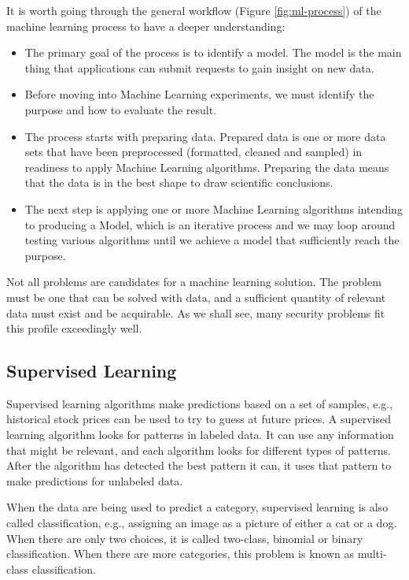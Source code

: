 It is worth going through the general workflow (Figure \ref{fig:ml-process}) of the machine learning process to have a deeper understanding:

\begin{itemize}
\item The primary goal of the process is to identify a model. The model is the main thing that applications can submit requests to gain insight on new data.
\item Before moving into Machine Learning experiments, we must identify the purpose and how to evaluate the result.
\item The process starts with preparing data. Prepared data is one or more data sets that have been preprocessed (formatted, cleaned and sampled) in readiness to apply Machine Learning algorithms. Preparing the data means that the data is in the best shape to draw scientific conclusions.
\item The next step is applying one or more Machine Learning algorithms intending to producing a Model, which is an iterative process and we may loop around testing various algorithms until we achieve a model that sufficiently reach the purpose.
\end{itemize}

Not all problems are candidates for a machine learning solution. The problem must be one that can be solved with data, and a sufficient quantity of relevant data must exist and be acquirable. As we shall see, many security problems fit this profile exceedingly well.

\subsection{Supervised Learning}
\label{ssec:supervised-learning}

Supervised learning algorithms make predictions based on a set of samples, e.g., historical stock prices can be used to try to guess at future prices. A supervised learning algorithm looks for patterns in labeled data. It can use any information that might be relevant, and each algorithm looks for different types of patterns. After the algorithm has detected the best pattern it can, it uses that pattern to make predictions for unlabeled data.

When the data are being used to predict a category, supervised learning is also called classification, e.g., assigning an image as a picture of either a cat or a dog. When there are only two choices, it is called two-class, binomial or binary classification. When there are more categories, this problem is known as multi-class classification.


